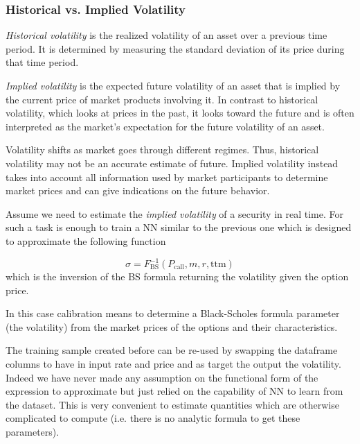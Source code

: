 \begin{attention}
\subsubsection{Historical vs. Implied Volatility}
\label{historical-vs.-implied-volatility}
	
\emph{Historical volatility} is the realized volatility of an asset over a previous time period. It is determined by measuring the standard deviation of its price during that time period.
	
\emph{Implied volatility} is the expected future volatility of an asset that is implied by the current price of market products involving it.
In contrast to historical volatility, which looks at prices in the past, it looks toward the future and is often interpreted as the market's expectation for the future volatility of an asset.
	
Volatility shifts as market goes through different regimes. Thus, historical volatility may not be an accurate estimate of future. Implied volatility instead takes into account all information used by market participants to determine market prices and can give indications on the future behavior.
\end{attention}

Assume we need to estimate the \emph{implied volatility} of a security in real time. For such a task is enough to train a NN similar to the previous one which is designed to approximate the following function

\begin{equation} 
\sigma = F^{-1}_\textrm{BS}(P_\textrm{call}, m, r, \mathrm{ttm})
\end{equation}
\noindent
which is the inversion of the BS formula returning the volatility given the option price.

In this case calibration means to determine a Black-Scholes formula parameter (the volatility) from the market prices of the options and their characteristics.

The training sample created before can be re-used by swapping the dataframe columns to have in input rate and price and as target the output the volatility. 
Indeed we have never made any assumption on the functional form of the expression to approximate but just relied on the capability of NN to learn from the dataset.
This is very convenient to estimate quantities which are otherwise complicated to compute (i.e. there is no analytic formula to get these parameters).
 
